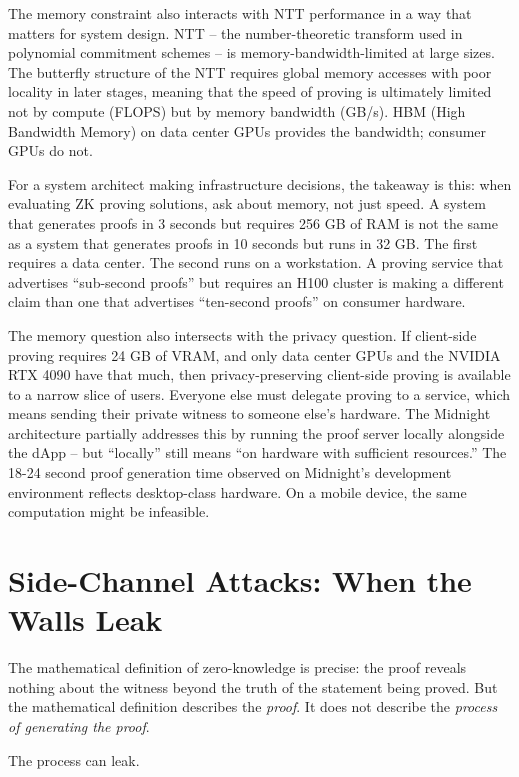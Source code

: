 \documentclass[
  11pt,
  openany]{report}
\begin{document}
The memory constraint also interacts with NTT performance in a way that matters
for system design. NTT -- the number-theoretic transform used in polynomial
commitment schemes -- is memory-bandwidth-limited at large sizes. The butterfly
structure of the NTT requires global memory accesses with poor locality in later
stages, meaning that the speed of proving is ultimately limited not by compute
(FLOPS) but by memory bandwidth (GB/s). HBM (High Bandwidth Memory) on data
center GPUs provides the bandwidth; consumer GPUs do not.

For a system architect making infrastructure decisions, the takeaway is this:
when evaluating ZK proving solutions, ask about memory, not just speed. A system
that generates proofs in 3 seconds but requires 256 GB of RAM is not the same as
a system that generates proofs in 10 seconds but runs in 32 GB. The first
requires a data center. The second runs on a workstation. A proving service that
advertises ``sub-second proofs'' but requires an H100 cluster is making a
different claim than one that advertises ``ten-second proofs'' on consumer
hardware.

The memory question also intersects with the privacy question. If client-side
proving requires 24 GB of VRAM, and only data center GPUs and the NVIDIA RTX
4090 have that much, then privacy-preserving client-side proving is available to
a narrow slice of users. Everyone else must delegate proving to a service, which
means sending their private witness to someone else's hardware. The Midnight
architecture partially addresses this by running the proof server locally
alongside the dApp -- but ``locally'' still means ``on hardware with sufficient
resources.'' The 18-24 second proof generation time observed on Midnight's
development environment reflects desktop-class hardware. On a mobile device, the
same computation might be infeasible.

\section{Side-Channel Attacks: When the Walls
Leak}\label{side-channel-attacks-when-the-walls-leak}

The mathematical definition of zero-knowledge is precise: the proof reveals
nothing about the witness beyond the truth of the statement being proved. But
the mathematical definition describes the \emph{proof}. It does not describe the
\emph{process of generating the proof}.

The process can leak.
\end{document}
